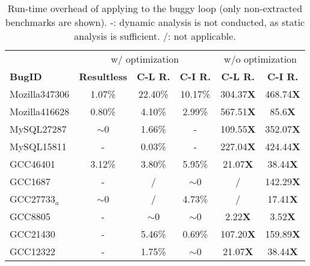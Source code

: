 \begin{table}
  \centering
  \scriptsize
  \newcommand{\Yes}[1]{\checkmark{}$_#1$}
  \newcommand{\No}[0]{-}
  \begin{tabular}{lccccc}
    \toprule
	    & \multicolumn{3}{c}{\Tool w/ optimization} & \multicolumn{2}{c}{w/o optimization} \\
     \cmidrule(lr){2-4}
     \cmidrule(lr){5-6}
     {\bf BugID}  & {\bf Resultless}  &  {\bf C-L R. } & {\bf C-I R. }  & {\bf C-L R.}  & {\bf C-I R. } \\
    \midrule
    Mozilla347306 &  1.07\%           &  22.40\%       &  10.17\%       & 304.37{\bf X} & 468.74{\bf X} \\ 
    Mozilla416628 &  0.80\%           &  4.10\%        &  2.99\%        & 567.51{\bf X} & 85.6{\bf X} \\
    \midrule
     MySQL27287   & $\sim$0           &   1.66\%       &   -            & 109.55{\bf X} & 352.07{\bf X} \\
     MySQL15811   &  -                &   0.03\%       &   -            & 227.04{\bf X} & 424.44{\bf X} \\
    \midrule
      GCC46401    & 3.12\%         & 3.80\%            &  5.95\%        & 21.07{\bf X}  & 38.44{\bf X}\\ 
      GCC1687     & -              & /                 &  $\sim$0       &   /           & 142.29{\bf X} \\
      GCC27733$_a$    & $\sim$0        & /                 &  4.73\%        &   /           & 17.41{\bf X}     \\
      GCC8805     & -              & $\sim$0           & $\sim$0        & 2.22{\bf X}   &  3.52{\bf X}\\
      GCC21430    & -              & 5.46\%            &   0.69\%       & 107.20{\bf X} & 159.89{\bf X} \\
      GCC12322    & -              & 1.75\%            &  $\sim$0       & 21.07{\bf X}  & 38.44{\bf X} \\
   \bottomrule
   \end{tabular}
  \caption{Run-time overhead of applying \Tool to the buggy loop
    (only non-extracted benchmarks are shown). 
  -: dynamic analysis is not conducted, as static analysis is sufficient.
  /: not applicable.}
  \label{tab:performance}
\end{table}


